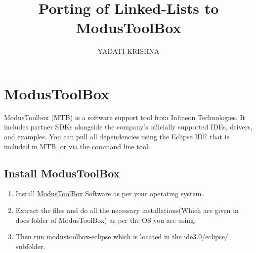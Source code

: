 \documentclass[journal,5pt,twocolumn]{IEEEtran}
\renewcommand\thesection{\arabic{section}}
\begin{document}
\let\StandardTheFigure\thefigure
\let\StandardTheFigure\thefigure
\let\StandardTheTable\thetable
\let\vec\mathbf
\def\putbox#1#2#3{\makebox[0in][l]{\makebox[#1][l]{}\raisebox{\baselineskip}[0in][0in]{\raisebox{#2}[0in][0in]{#3}}}}
     \def\rightbox#1{\makebox[0in][r]{#1}}
     \def\centbox#1{\makebox[0in]{#1}}
     \def\topbox#1{\raisebox{-\baselineskip}[0in][0in]{#1}}
     \def\midbox#1{\raisebox{-0.5\baselineskip}[0in][0in]{#1}}
\title{ 
Porting of Linked-Lists to ModusToolBox  
}
\author{YADATI KRISHNA }%
\maketitle

\section{\textbf{ModusToolBox}}
ModusToolbox (MTB) is a software support tool from Infineon Technologies. It includes partner SDKs alongside the company's officially supported IDEs, drivers, and examples. You can pull all dependencies using the Eclipse IDE that is included in MTB, or via the command line tool.
\subsection{\textbf{Install ModusToolBox}}
\begin{enumerate}
\item Install {\href{https://www.infineon.com/cms/en/design-support/tools/sdk/modustoolbox-software/?redirId=VL1299}{ModusToolBox}} Software as per your operating system.
\item Extract the files and do all the necessary installations(Which are given in docs folder of ModusToolBox) as per the OS you are using. 
\item Then run modustoolbox-eclipse which is located in the ide3.0/eclipse/ subfolder.
 \end{enumerate}
\end{document}
